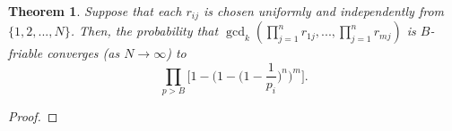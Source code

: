 \documentclass[10pt,a4paper]{article}
\newtheorem{theorem}{Theorem}[section]
\newtheorem{lemma}[theorem]{Lemma}
\theoremstyle{definition}
\theoremstyle{remark}
\begin{document}
\begin{theorem} Suppose that each $r_{ij}$ is chosen uniformly and independently from $\{1, 2, ..., N\}$. Then, the probability that $\gcd_k(\prod_{j=1}^n r_{1j}, ... , \prod_{j=1}^n r_{mj})$ is $B$-friable converges (as $N \to \infty$) to
$$\prod_{p>B} \Big[1 - \Big(1 - \Big(1-\frac{1}{p_i}\Big)^n\Big)^m\Big].$$
\end{theorem}
\begin{proof}
\end{proof}




\end{document}
